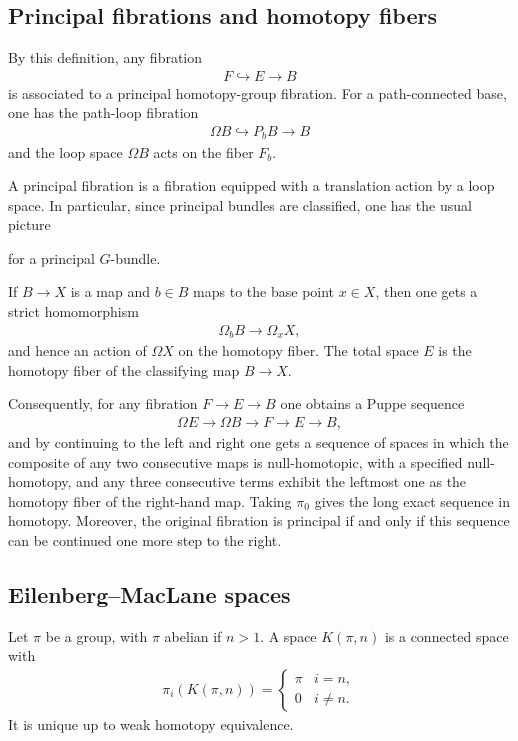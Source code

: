 \documentclass[12pt]{article}
\begin{document}
\subsection{Principal fibrations and homotopy fibers}
By this definition, any fibration
\begin{align*}
    F \hookrightarrow E \to B
\end{align*}
is associated to a principal homotopy-group fibration.
For a path-connected base, one has the path-loop fibration
\begin{align*}
    \Omega B \hookrightarrow P_bB \to B
\end{align*}
and the loop space $\Omega B$ acts on the fiber $F_b$.

A principal fibration is a fibration equipped with a translation action by a loop space. In particular, since principal bundles are classified, one has the usual picture
\begin{center}
\end{center}
for a principal $G$-bundle.

If $B \to X$ is a map and $b \in B$ maps to the base point $x \in X$, then one gets a strict homomorphism
\begin{align*}
    \Omega_b B \to \Omega_x X,
\end{align*}
and hence an action of $\Omega X$ on the homotopy fiber.
The total space $E$ is the homotopy fiber of the classifying map $B \to X$.

Consequently, for any fibration $F \to E \to B$ one obtains a Puppe sequence
\begin{align*}
    \Omega E \to \Omega B \to F \to E \to B,
\end{align*}
and by continuing to the left and right one gets a sequence of spaces in which the composite of any two consecutive maps is null-homotopic, with a specified null-homotopy, and any three consecutive terms exhibit the leftmost one as the homotopy fiber of the right-hand map.
Taking $\pi_0$ gives the long exact sequence in homotopy. Moreover, the original fibration is principal if and only if this sequence can be continued one more step to the right.

\subsection{Eilenberg--MacLane spaces}
Let $\pi$ be a group, with $\pi$ abelian if $n>1$. A space $K(\pi,n)$ is a connected space with
\begin{align*}
    \pi_i(K(\pi,n)) =
    \begin{cases}
        \pi & i=n, \\
        0 & i\neq n.
    \end{cases}
\end{align*}
It is unique up to weak homotopy equivalence.
\end{document}
